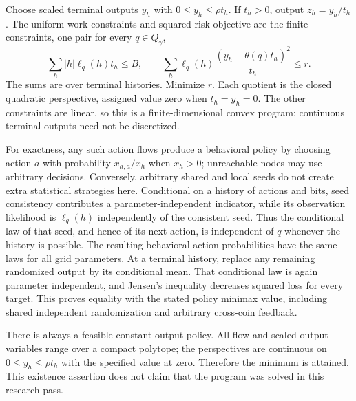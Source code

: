 \documentclass[11pt]{article}
\begin{document}
Choose scaled terminal outputs $y_h$ with $0\le y_h\le\rho t_h$. If $t_h>0$,
output $z_h=y_h/t_h$. The uniform work constraints and squared-risk objective
are the finite constraints, one pair for every $q\in Q_\gamma$,
\[
 \sum_h |h|\ell_q(h)t_h\le B,\qquad
 \sum_h\ell_q(h)\frac{(y_h-\theta(q)t_h)^2}{t_h}\le r.
\]
The sums are over terminal histories. Minimize $r$. Each quotient is the
closed quadratic perspective, assigned value zero when $t_h=y_h=0$.
The other constraints are linear, so this is a finite-dimensional convex
program; continuous terminal outputs need not be discretized.

For exactness, any such action flows produce a behavioral policy by choosing
action $a$ with probability $x_{h,a}/x_h$ when $x_h>0$; unreachable nodes may
use arbitrary decisions. Conversely, arbitrary shared and local seeds do
not create extra statistical strategies here. Conditional on a history of
actions and bits, seed consistency contributes a parameter-independent
indicator, while its observation likelihood is $\ell_q(h)$ independently
of the consistent seed. Thus the conditional law of that seed, and hence of
its next action, is independent of $q$ whenever the history is possible.
The resulting behavioral action probabilities have the same laws for all
grid parameters. At a terminal history, replace any remaining randomized
output by its conditional mean. That conditional law is again parameter
independent, and Jensen's inequality decreases squared loss for every
target. This proves equality with the stated policy minimax value, including
shared independent randomization and arbitrary cross-coin feedback.

There is always a feasible constant-output policy. All flow and scaled-output
variables range over a compact polytope; the perspectives are continuous
on $0\le y_h\le\rho t_h$ with the specified value at zero. Therefore the
minimum is attained. This existence assertion does not claim that the
program was solved in this research pass.
\end{document}

